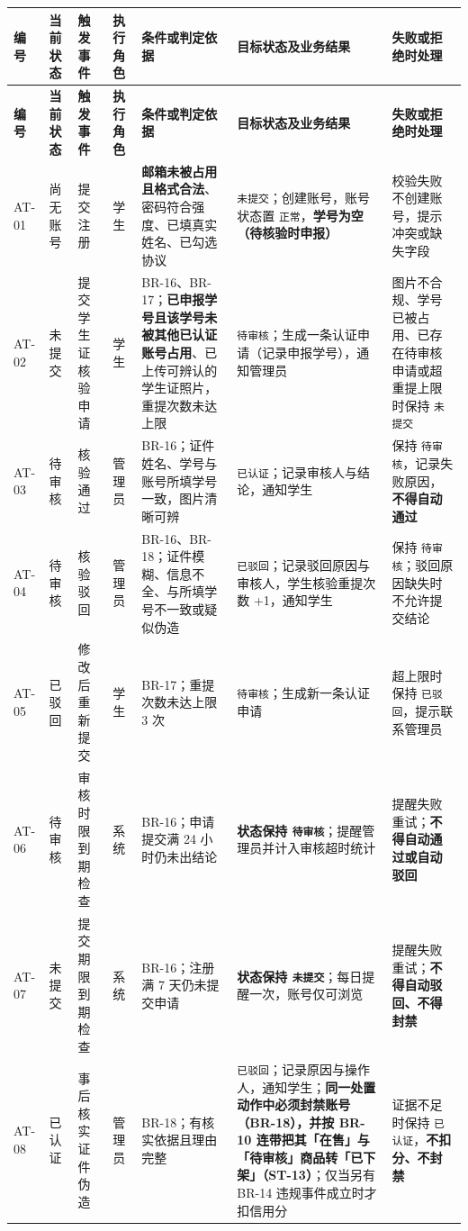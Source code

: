 \documentclass[12pt,a4paper]{ctexart}
\begin{document}
{\scriptsize
\begin{longtable}{|p{1.29cm}|p{1.29cm}|p{1.29cm}|p{1.29cm}|p{3.29cm}|p{5.06cm}|p{2.50cm}|}
\hline
\textbf{编号} & \textbf{当前状态} & \textbf{触发事件} & \textbf{执行角色} & \textbf{条件或判定依据} & \textbf{目标状态及业务结果} & \textbf{失败或拒绝时处理} \\
\hline
\endfirsthead
\hline
\textbf{编号} & \textbf{当前状态} & \textbf{触发事件} & \textbf{执行角色} & \textbf{条件或判定依据} & \textbf{目标状态及业务结果} & \textbf{失败或拒绝时处理} \\
\hline
\endhead
\hline
\endfoot
AT-01 & 尚无账号 & 提交注册 & 学生 & \textbf{邮箱未被占用且格式合法}、密码符合强度、已填真实姓名、已勾选协议 & \texttt{未提交}；创建账号，账号状态置 \texttt{正常}，\textbf{学号为空（待核验时申报）} & 校验失败不创建账号，提示冲突或缺失字段 \\
\hline
AT-02 & 未提交 & 提交学生证核验申请 & 学生 & BR-16、BR-17；\textbf{已申报学号且该学号未被其他已认证账号占用}、已上传可辨认的学生证照片，重提次数未达上限 & \texttt{待审核}；生成一条认证申请（记录申报学号），通知管理员 & 图片不合规、学号已被占用、已存在待审核申请或超重提上限时保持 \texttt{未提交} \\
\hline
AT-03 & 待审核 & 核验通过 & 管理员 & BR-16；证件姓名、学号与账号所填学号一致，图片清晰可辨 & \texttt{已认证}；记录审核人与结论，通知学生 & 保持 \texttt{待审核}，记录失败原因，\textbf{不得自动通过} \\
\hline
AT-04 & 待审核 & 核验驳回 & 管理员 & BR-16、BR-18；证件模糊、信息不全、与所填学号不一致或疑似伪造 & \texttt{已驳回}；记录驳回原因与审核人，学生核验重提次数 +1，通知学生 & 保持 \texttt{待审核}；驳回原因缺失时不允许提交结论 \\
\hline
AT-05 & 已驳回 & 修改后重新提交 & 学生 & BR-17；重提次数未达上限 3 次 & \texttt{待审核}；生成新一条认证申请 & 超上限时保持 \texttt{已驳回}，提示联系管理员 \\
\hline
AT-06 & 待审核 & 审核时限到期检查 & 系统 & BR-16；申请提交满 24 小时仍未出结论 & \textbf{状态保持 \texttt{待审核}}；提醒管理员并计入审核超时统计 & 提醒失败重试；\textbf{不得自动通过或自动驳回} \\
\hline
AT-07 & 未提交 & 提交期限到期检查 & 系统 & BR-16；注册满 7 天仍未提交申请 & \textbf{状态保持 \texttt{未提交}}；每日提醒一次，账号仅可浏览 & 提醒失败重试；\textbf{不得自动驳回、不得封禁} \\
\hline
AT-08 & 已认证 & 事后核实证件伪造 & 管理员 & BR-18；有核实依据且理由完整 & \texttt{已驳回}；记录原因与操作人，通知学生；\textbf{同一处置动作中必须封禁账号（BR-18），并按 BR-10 连带把其「在售」与「待审核」商品转「已下架」（ST-13）}；仅当另有 BR-14 违规事件成立时才扣信用分 & 证据不足时保持 \texttt{已认证}，\textbf{不扣分、不封禁} \\
\hline
\end{longtable}
}
\end{document}
